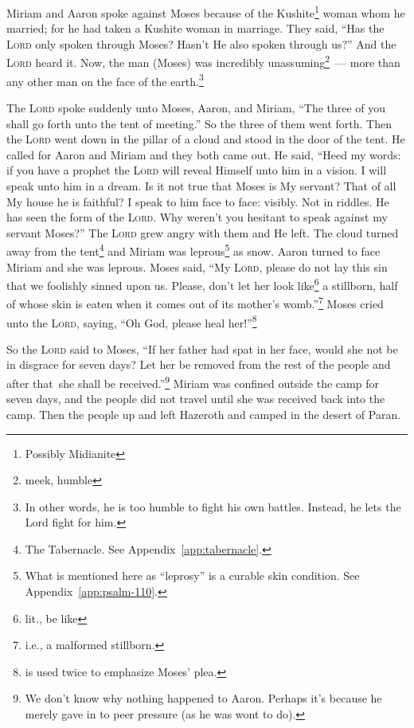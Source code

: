 
\begin{inparaenum}
     Miriam and Aaron spoke against Moses because of the Kushite\footnote{Possibly Midianite} woman whom he married; for he had taken a Kushite woman in marriage.%
     They said, ``Has the \textsc{Lord} only spoken through Moses? Hasn't He also spoken through us?'' And the \textsc{Lord} heard it.%
     Now, the man (Moses) was incredibly unassuming\footnote{meek, humble}~--- more than any other man on the face of the earth.\footnote{In other words, he is too humble to fight his own battles. Instead, he lets the Lord fight for him.}%
    
     The \textsc{Lord} spoke suddenly unto Moses, Aaron, and Miriam, ``The three of you shall go forth unto the tent of meeting.'' So the three of them went forth.%
     Then the \textsc{Lord} went down in the pillar of a cloud and stood in the door of the tent. He called for Aaron and Miriam and they both came out.%
     He said, ``Heed my words: if you have a prophet the \textsc{Lord} will reveal Himself unto him in a vision. I will speak unto him in a dream.%
     Is it not true that Moses is My servant? That of all My house he is faithful?%
     I speak to him face to face: visibly. Not in riddles. He has seen the form of the \textsc{Lord}. Why weren't you hesitant to speak against my servant Moses?''%
     The \textsc{Lord} grew angry with them and He left.%
     The cloud turned away from the tent\footnote{The Tabernacle. See Appendix~\ref{app:tabernacle}.} and Miriam was leprous\footnote{What is mentioned here as ``leprosy'' is a curable skin condition. See Appendix~\ref{app:psalm-110}.} as snow. Aaron turned to face Miriam and she was leprous.
     Moses said, ``My \textsc{Lord}, please do not lay this sin that we foolishly sinned upon us.%
     Please, don't let her look like\footnote{lit., be like} a stillborn, half of whose skin is eaten when it comes out of its mother's womb.''\footnote{i.e., a malformed stillborn.}%
     Moses cried unto the \textsc{Lord}, saying, ``Oh God, please heal her!''\footnote{ is used twice to emphasize Moses' plea.}%
    
     So the \textsc{Lord} said to Moses, ``If her father had spat in her face, would she not be in disgrace for seven days? Let her be removed from the rest of the people and after that\understood\ she shall be received.''\footnote{We don't know why nothing happened to Aaron. Perhaps it's because he merely gave in to peer pressure (as he was wont to do).}%
     Miriam was confined outside the camp for seven days, and the people did not travel until she was received back into the camp.%
     Then the people up and left Hazeroth and camped in the desert of Paran.%
\end{inparaenum}
